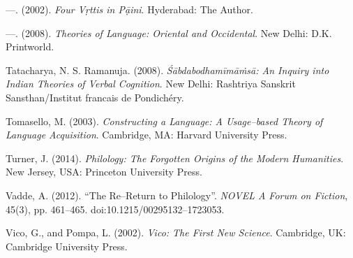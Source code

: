 \begin{thebibliography}{99}
  —. (2002). \textit{Four \textit{Vṛttis} in Pạ̄ini}. Hyderabad: The Author.

  —. (2008). \textit{Theories of Language: Oriental and Occidental}. New Delhi: D.K. Printworld.

  Tatacharya, N. S. Ramanuja. (2008). \textit{Śābdabodhamīmāṁsā: An Inquiry into Indian Theories of Verbal Cognition}. New Delhi: Rashtriya Sanskrit Sansthan/Institut francais de Pondichéry.

  Tomasello, M. (2003). \textit{Constructing a Language: A Usage–based Theory of Language Acquisition}. Cambridge, MA: Harvard University Press.

  Turner, J. (2014). \textit{Philology: The Forgotten Origins of the Modern Humanities}. New Jersey, USA: Princeton University Press.

  Vadde, A. (2012). “The Re–Return to Philology”. \textit{NOVEL A Forum on Fiction}, 45(3), pp. 461–465. doi:10.1215/00295132–1723053.

  Vico, G., and Pompa, L. (2002). \textit{Vico: The First New Science}. Cambridge, UK: Cambridge University Press.

 \end{thebibliography}

\theendnotes

